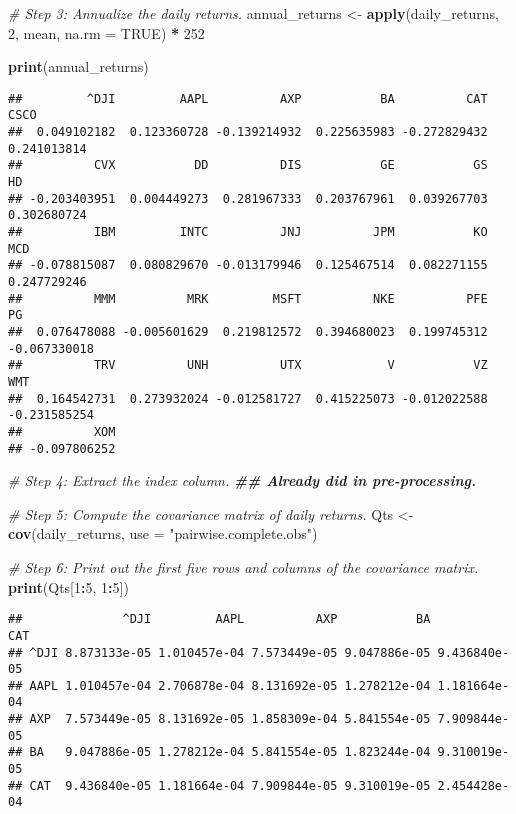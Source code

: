 \documentclass[
]{article}
\newenvironment{Shaded}{\begin{snugshade}}{\end{snugshade}}
\newcommand{\AttributeTok}[1]{\textcolor[rgb]{0.13,0.29,0.53}{#1}}
\newcommand{\CommentTok}[1]{\textcolor[rgb]{0.56,0.35,0.01}{\textit{#1}}}
\newcommand{\ConstantTok}[1]{\textcolor[rgb]{0.56,0.35,0.01}{#1}}
\newcommand{\DecValTok}[1]{\textcolor[rgb]{0.00,0.00,0.81}{#1}}
\newcommand{\DocumentationTok}[1]{\textcolor[rgb]{0.56,0.35,0.01}{\textbf{\textit{#1}}}}
\newcommand{\FunctionTok}[1]{\textcolor[rgb]{0.13,0.29,0.53}{\textbf{#1}}}
\newcommand{\NormalTok}[1]{#1}
\newcommand{\OtherTok}[1]{\textcolor[rgb]{0.56,0.35,0.01}{#1}}
\newcommand{\SpecialCharTok}[1]{\textcolor[rgb]{0.81,0.36,0.00}{\textbf{#1}}}
\newcommand{\StringTok}[1]{\textcolor[rgb]{0.31,0.60,0.02}{#1}}
\begin{document}
\begin{Shaded}
\begin{Highlighting}[]
\CommentTok{\# Step 3: Annualize the daily returns.}
\NormalTok{annual\_returns }\OtherTok{\textless{}{-}} \FunctionTok{apply}\NormalTok{(daily\_returns, }\DecValTok{2}\NormalTok{, mean, }\AttributeTok{na.rm =} \ConstantTok{TRUE}\NormalTok{) }\SpecialCharTok{*} \DecValTok{252}

\FunctionTok{print}\NormalTok{(annual\_returns)}
\end{Highlighting}
\end{Shaded}

\begin{verbatim}
##         ^DJI         AAPL          AXP           BA          CAT         CSCO 
##  0.049102182  0.123360728 -0.139214932  0.225635983 -0.272829432  0.241013814 
##          CVX           DD          DIS           GE           GS           HD 
## -0.203403951  0.004449273  0.281967333  0.203767961  0.039267703  0.302680724 
##          IBM         INTC          JNJ          JPM           KO          MCD 
## -0.078815087  0.080829670 -0.013179946  0.125467514  0.082271155  0.247729246 
##          MMM          MRK         MSFT          NKE          PFE           PG 
##  0.076478088 -0.005601629  0.219812572  0.394680023  0.199745312 -0.067330018 
##          TRV          UNH          UTX            V           VZ          WMT 
##  0.164542731  0.273932024 -0.012581727  0.415225073 -0.012022588 -0.231585254 
##          XOM 
## -0.097806252
\end{verbatim}

\begin{Shaded}
\begin{Highlighting}[]
\CommentTok{\# Step 4: Extract the index column.}
\DocumentationTok{\#\# Already did in pre{-}processing.}

\CommentTok{\# Step 5: Compute the covariance matrix of daily returns.}
\NormalTok{Qts }\OtherTok{\textless{}{-}} \FunctionTok{cov}\NormalTok{(daily\_returns, }\AttributeTok{use =} \StringTok{"pairwise.complete.obs"}\NormalTok{)}

\CommentTok{\# Step 6: Print out the first five rows and columns of the covariance matrix.}
\FunctionTok{print}\NormalTok{(Qts[}\DecValTok{1}\SpecialCharTok{:}\DecValTok{5}\NormalTok{, }\DecValTok{1}\SpecialCharTok{:}\DecValTok{5}\NormalTok{])}
\end{Highlighting}
\end{Shaded}

\begin{verbatim}
##              ^DJI         AAPL          AXP           BA          CAT
## ^DJI 8.873133e-05 1.010457e-04 7.573449e-05 9.047886e-05 9.436840e-05
## AAPL 1.010457e-04 2.706878e-04 8.131692e-05 1.278212e-04 1.181664e-04
## AXP  7.573449e-05 8.131692e-05 1.858309e-04 5.841554e-05 7.909844e-05
## BA   9.047886e-05 1.278212e-04 5.841554e-05 1.823244e-04 9.310019e-05
## CAT  9.436840e-05 1.181664e-04 7.909844e-05 9.310019e-05 2.454428e-04
\end{verbatim}
\end{document}
